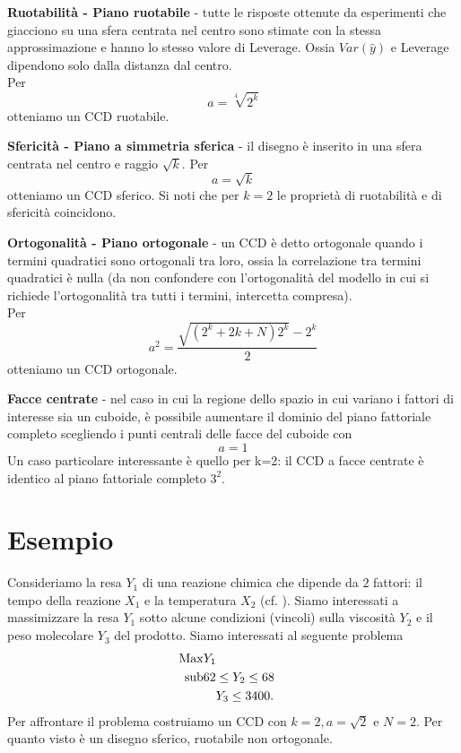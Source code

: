 \documentclass[
  11pt,
]{book}
\begin{document}
\textbf{Ruotabilità - Piano ruotabile} - tutte le risposte ottenute da esperimenti che giacciono su una sfera centrata nel centro sono stimate con la stessa approssimazione e hanno lo stesso valore di Leverage. Ossia \(Var(\hat{y})\) e Leverage dipendono solo dalla distanza dal centro.\\
Per
\[
    a=\sqrt[4]{2^k}
\]
otteniamo un CCD ruotabile.

\textbf{Sfericità - Piano a simmetria sferica} - il disegno è inserito in una sfera centrata nel centro e raggio \(\sqrt{k}\). \newline
Per
\[
    a=\sqrt{k}
\]
otteniamo un CCD sferico. \newline
Si noti che per \(k=2\) le proprietà di ruotabilità e di sfericità coincidono.

\textbf{Ortogonalità - Piano ortogonale} - un CCD è detto ortogonale quando i termini quadratici sono ortogonali tra loro, ossia la correlazione tra termini quadratici è nulla (da non confondere con l'ortogonalità del modello in cui si richiede l'ortogonalità tra tutti i termini, intercetta compresa).\\
Per
\begin{equation}
    a^2=\frac{\sqrt{(2^k+2k+N)2^k}-2^k}{2}
    \label{eq:CCDOrt}
\end{equation}
otteniamo un CCD ortogonale.

\textbf{Facce centrate} - nel caso in cui la regione dello spazio in cui variano i fattori di interesse sia un cuboide, è possibile aumentare il dominio del piano fattoriale completo scegliendo i punti centrali delle facce del cuboide con
\[
a=1
\]
Un caso particolare interessante è quello per k=2: il CCD a facce centrate è identico al piano fattoriale completo \(3^2\).

\hypertarget{esempio}{%
\section{Esempio}\label{esempio}}

Consideriamo la resa \(Y_1\) di una reazione chimica che dipende da \(2\) fattori: il tempo della reazione \(X_1\) e la temperatura \(X_2\) (cf. \citep[Ex 11.2]{DesAnExp}).
Siamo interessati a massimizzare la resa \(Y_1\) sotto alcune condizioni (vincoli) sulla viscosità \(Y_2\) e il peso molecolare \(Y_3\) del prodotto. Siamo interessati al seguente problema
\begin{eqnarray*}
  \rm{Max} & Y_1 \\
  \rm{sub}  & 62\leq Y_2 \leq 68 \quad \\
                 & \quad Y_3 \leq 3400.
\end{eqnarray*}
Per affrontare il problema costruiamo un CCD con \(k=2, a=\sqrt{2}\) e \(N=2\). Per quanto visto è un disegno sferico, ruotabile non ortogonale.
\end{document}
